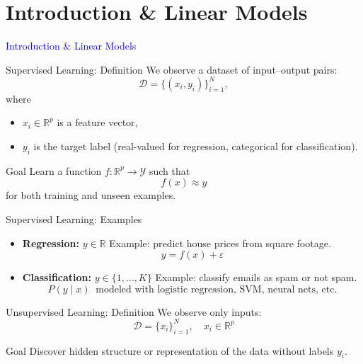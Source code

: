 \documentclass[../../main.tex]{subfiles}
\begin{document}
\graphicspath{{figures/}{lectures/01_intro_linear/figures/}}
\section{Introduction \& Linear Models}
\begin{frame}[plain]
  \vfill\begin{center}{\Huge \textcolor{blue}{Introduction \& Linear Models}}\end{center}\vfill
\end{frame}



\begin{frame}{Supervised Learning: Definition}
We observe a dataset of input–output pairs:
\[
\mathcal{D} = \{(x_i, y_i)\}_{i=1}^N,
\]
where
\begin{itemize}
    \item $x_i \in \mathbb{R}^p$ is a feature vector,
    \item $y_i$ is the target label (real-valued for regression, categorical for classification).
\end{itemize}

\begin{block}{Goal}
Learn a function $f: \mathbb{R}^p \to \mathcal{Y}$ such that
\[
f(x) \approx y
\]
for both training and unseen examples.
\end{block}
\end{frame}

\begin{frame}{Supervised Learning: Examples}
\begin{itemize}
    \item \textbf{Regression:} $y \in \mathbb{R}$  
    Example: predict house prices from square footage.
    \[
    y = f(x) + \varepsilon
    \]
    \item \textbf{Classification:} $y \in \{1,\ldots,K\}$  
    Example: classify emails as spam or not spam.
    \[
    P(y \mid x) \;\; \text{modeled with logistic regression, SVM, neural nets, etc.}
    \]
\end{itemize}
\end{frame}

\begin{frame}{Unsupervised Learning: Definition}
We observe only inputs:
\[
\mathcal{D} = \{x_i\}_{i=1}^N, \quad x_i \in \mathbb{R}^p
\]

\begin{block}{Goal}
Discover hidden structure or representation of the data without labels $y_i$.
\end{block}
\end{frame}
\end{document}
